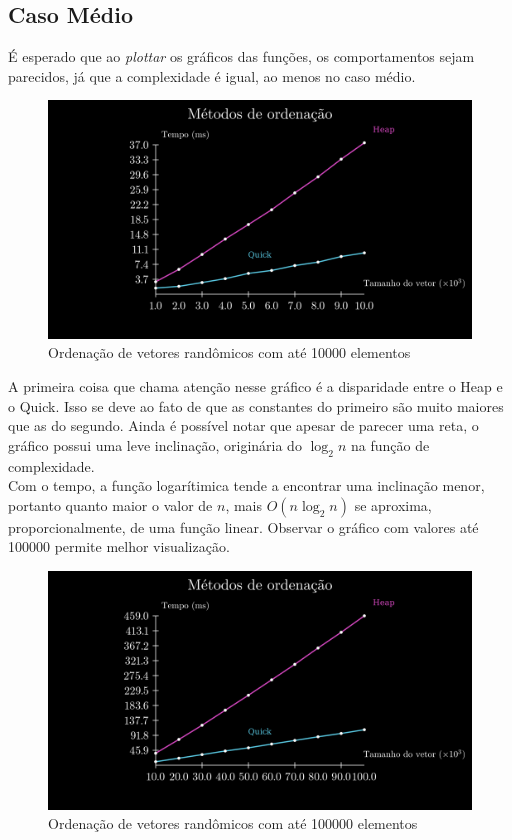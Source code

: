 \documentclass[fontsize=11pt]{article}
\begin{document}
  \subsection{Caso Médio}
    É esperado que ao \textit{plottar} os gráficos
    das funções, os comportamentos sejam parecidos, já que a complexidade é igual,
    ao menos no caso médio.
    \begin{figure}[H]
      \includegraphics[width=\textwidth]{graph10k.png} 
      \caption{Ordenação de vetores randômicos com até 10000 elementos}
      \label{fig:10k}
    \end{figure}
    A primeira coisa que chama atenção nesse gráfico é a disparidade entre o Heap
    e o Quick. Isso se deve ao fato de que as constantes do primeiro são muito 
    maiores que as do segundo. Ainda é possível notar que apesar de parecer uma reta, 
    o gráfico possui uma leve inclinação, originária do $\log_2 n$ na função de 
    complexidade.
    \\ Com o tempo, a função logarítimica tende a encontrar uma inclinação menor, 
    portanto quanto maior o valor de $n$, mais $O(n \log_2 n)$ se aproxima, proporcionalmente,
    de uma função linear. Observar o gráfico com valores até 100000 
    permite melhor visualização.
    \begin{figure}[H]
      \includegraphics[width=\textwidth]{graph100k.png} 
      \caption{Ordenação de vetores randômicos com até 100000 elementos}
      \label{fig:100k}
    \end{figure}
\end{document}
